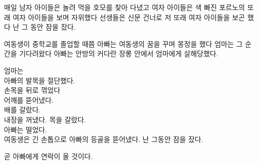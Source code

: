 매일 남자 아이들은 놀려 먹을 호모를 찾아 다녔고 여자 아이들은 색 빠진 포르노의 또래 여자 아이들을 보며 자위했다 선생들은 신문 건너로 저 또래 여자 아이들을 보곤 했다 난 그 동안 잠을 잤다.



여동생이 중학교를 졸업할 때쯤 아빠는 여동생의 꿈을 꾸며 몽정을 했다 엄마는 그 순간을 기다려왔다 아빠는 안방의 커다란 장롱 안에서 엄마에게 살해당했다.



엄마는\\

아빠의 발목을 절단했다.\\

손목을 뒤로 꺾었다\\

어깨를 뜯어냈다.\\

배를 갈랐다.\\

내장을 꺼냈다. 목을 갈랐다.\\

아빠는 떨었다.\\

여동생은 긴 손톱으로 아빠의 등골을 뜯어냈다. 난 그동안 잠을 잤다.



곧 아빠에게 연락이 올 것이다.

